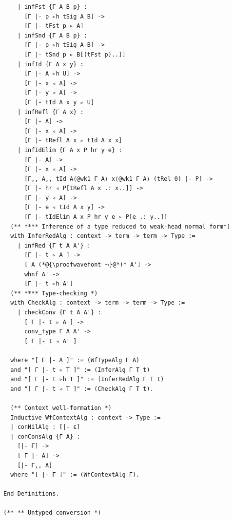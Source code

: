 \documentclass[10pt,a4paper]{amsart}
\begin{document}
\begin{lstlisting}
    | infFst {Γ A B p} :
      [Γ |- p ▹h tSig A B] ->
      [Γ |- tFst p ▹ A]
    | infSnd {Γ A B p} :
      [Γ |- p ▹h tSig A B] ->
      [Γ |- tSnd p ▹ B[(tFst p)..]]
    | infId {Γ A x y} :
      [Γ |- A ▹h U] ->
      [Γ |- x ◃ A] ->
      [Γ |- y ◃ A] ->
      [Γ |- tId A x y ▹ U]
    | infRefl {Γ A x} :
      [Γ |- A] ->
      [Γ |- x ◃ A] ->
      [Γ |- tRefl A x ▹ tId A x x]
    | infIdElim {Γ A x P hr y e} :
      [Γ |- A] ->
      [Γ |- x ◃ A] ->
      [Γ,, A,, tId A⟨@wk1 Γ A⟩ x⟨@wk1 Γ A⟩ (tRel 0) |- P] ->
      [Γ |- hr ◃ P[tRefl A x .: x..]] ->
      [Γ |- y ◃ A] ->
      [Γ |- e ◃ tId A x y] ->
      [Γ |- tIdElim A x P hr y e ▹ P[e .: y..]]
  (** **** Inference of a type reduced to weak-head normal form*)
  with InferRedAlg : context -> term -> term -> Type :=
    | infRed {Γ t A A'} :
      [Γ |- t ▹ A ] ->
      [ A (*@{\proofwavefont ⤳}@*)* A'] ->
      whnf A' ->
      [Γ |- t ▹h A']
  (** **** Type-checking *)
  with CheckAlg : context -> term -> term -> Type :=
    | checkConv {Γ t A A'} :
      [ Γ |- t ▹ A ] -> 
      conv_type Γ A A' ->
      [ Γ |- t ◃ A' ]

  where "[ Γ |- A ]" := (WfTypeAlg Γ A)
  and "[ Γ |- t ▹ T ]" := (InferAlg Γ T t)
  and "[ Γ |- t ▹h T ]" := (InferRedAlg Γ T t)
  and "[ Γ |- t ◃ T ]" := (CheckAlg Γ T t).

  (** Context well-formation *)
  Inductive WfContextAlg : context -> Type :=
  | conNilAlg : [|- ε]
  | conConsAlg {Γ A} :
    [|- Γ] ->
    [ Γ |- A] ->
    [|- Γ,, A]
  where "[ |- Γ ]" := (WfContextAlg Γ).

End Definitions.

(** ** Untyped conversion *)


\end{lstlisting}
\end{document}
